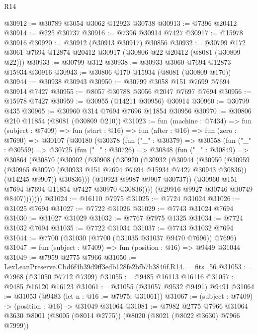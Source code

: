 \begin{lexlean}{R14}
\begin{coremodule}
@30912 := @30789 @3054 @3062 @12923 @30738
@30913 := @7396 @20412
@30914 := @225 @30737
@30916 := @7396 @30914 @7427
@30917 := @15978 @30916
@30920 := @30912 (@30913 @30917) @30856
@30932 := @30799 @172 @3061 @7694 @12874 @20412 @30917 (@30806 @22 @20412 (@8081 (@30809 @22)))
@30933 := @30799 @312
@30938 := @30933 @3060 @7694 @12873 @15934 @30916
@30943 := @30806 @170 @15934 (@8081 (@30809 @170))
@30944 := @30938 @30943
@30950 := @30799 @3058 @151 @7699 @7694 @30914 @7427
@30955 := @8057 @30788 @3056 @2047 @7697 @7694
@30956 := @15978 @7427
@30959 := @30955 (@14211 @30956) @30914
@30960 := @30799 @435
@30965 := @30960 @314 @7694 @7696 @11854 @30956
@30970 := @30806 @210 @11854 (@8081 (@30809 @210))
@31023 := fun (machine : @7434) =>
  fun (subject : @7409) =>
  fun (start : @16) =>
  fun (after : @16) =>
  fun (zero : @7690) =>
  @30107
    (@30180
      (@30378
        (fun ("_" : @30379) =>
        @30558
          (fun ("_" : @30559) =>
          @30725
            (fun ("_" : @30726) =>
            @30848
              (fun ("_" : @30849) =>
              @30864
                (@30870
                  (@30902
                    (@30908
                      (@30920
                        (@30932
                          (@30944
                            (@30950
                              (@30959
                                (@30965 @30970 (@30933 @151 @7694 @7694 @15934 @7427 @30943 @30836))
                                (@14245 @9907))
                              @30836)))
                        (@10923 @9987 @9907 @30737))
                      (@30960 @151 @7694 @7694 @11854 @7427 @30970 @30836))))
                (@29916 @9927 @30746 @30749 @8407)))))))
@31024 := @16110 @7975
@31025 := @7724 @31024
@31026 := @31025 @7694
@31027 := @7722 @31026
@31029 := @7743 @31024 @7694
@31030 := @31027 @31029
@31032 := @7767 @7975 @1325
@31034 := @7724 @31032 @7694
@31035 := @7722 @31034
@31037 := @7743 @31032 @7694
@31044 := @7700 (@31030 (@7700 (@31035 @31037 @9470 @7696)) @7696)
@31047 := fun (subject : @7409) => fun (position : @16) => @9449 @31044
@31049 := @7959 @2775 @7966
@31050 := LexLeanPreserve.Cbd6f4b39d9ff3edb128fe2bfb7b3846f.R14.__fits_56
@31053 := @7968 (@31050 @7712 @7399)
@31055 := @9485 @16113 @16116
@31057 := @9485 @16120 @16123
@31061 := @31055 (@31057 @9532 @9491) @9491
@31064 := @31053 (@9483 (let n : @16 := @7975; @31061))
@31067 := (subject : @7409) -> (position : @16) -> @31049 @31064
@31081 := @7982
    @2775
    @7966
    @31064
    @3630
    @8001
    (@8005 (@8014 @2775))
    (@8020 (@8021 (@8022 @3630) @7966 @7999))

\end{coremodule}
\end{lexlean}
